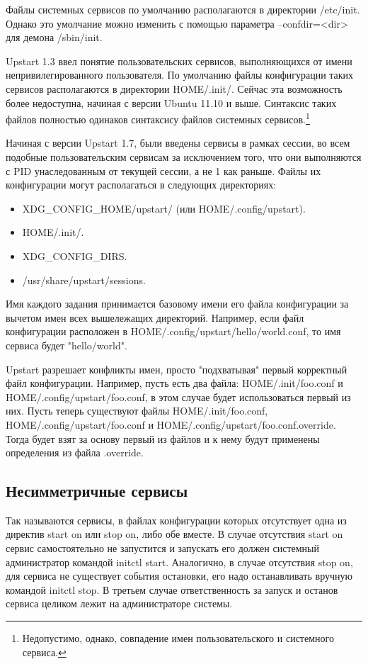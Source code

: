 Файлы системных сервисов по умолчанию располагаются в директории /etc/init. Однако это умолчание можно изменить с помощью параметра --confdir=<dir> для демона /sbin/init. 

Upstart 1.3 ввел понятие пользовательских сервисов, выполняющихся от имени непривилегированного пользователя. По умолчанию файлы конфигурации таких сервисов располагаются в директории \textdollar HOME/.init/. Сейчас эта возможность более недоступна, начиная с версии Ubuntu 11.10 и выше.
Синтаксис таких файлов полностью одинаков синтаксису файлов системных сервисов.\footnote{Недопустимо, однако, совпадение имен пользовательского и системного сервиса.}

Начиная с версии Upstart 1.7, были введены сервисы в рамках сессии, во всем подобные пользовательским сервисам за исключением того, что они выполняются с PID унаследованным от текущей сессии, а не 1 как
раньше. 
Файлы их конфигурации могут располагаться в следующих директориях: \begin{itemize}
\item \textdollar XDG\_CONFIG\_HOME/upstart/ (или \textdollar HOME/.config/upstart).
\item \textdollar HOME/.init/.
\item \textdollar XDG\_CONFIG\_DIRS.
\item /usr/share/upstart/sessions.
\end{itemize}
Имя каждого задания принимается базовому имени его файла конфигурации за вычетом имен всех вышележащих директорий. Например, если файл конфигурации расположен в \textdollar HOME/.config/upstart/hello/world.conf, то имя сервиса будет "hello/world".

Upstart разрешает конфликты имен, просто "подхватывая" первый корректный файл конфигурации. Например, пусть есть два файла: \textdollar HOME/.init/foo.conf и \textdollar HOME/.config/upstart/foo.conf, 
в этом случае будет использоваться первый из них. Пусть теперь существуют файлы \textdollar HOME/.init/foo.conf, \textdollar HOME/.config/upstart/foo.conf и \textdollar HOME/.config/upstart/foo.conf.override. Тогда будет взят за основу первый из файлов и к нему будут применены определения из файла .override.
\subsection{Несимметричные сервисы}
Так называются сервисы, в файлах конфигурации которых отсутствует одна из директив start on или stop on, либо обе вместе. В случае отсутствия start on сервис самостоятельно не запустится и запускать его должен системный администратор командой initctl start. Аналогично, в случае отсутствия stop on, для сервиса не существует события остановки, его надо останавливать вручную командой initctl stop. В третьем случае ответственность за запуск и останов сервиса целиком лежит на администраторе системы.
